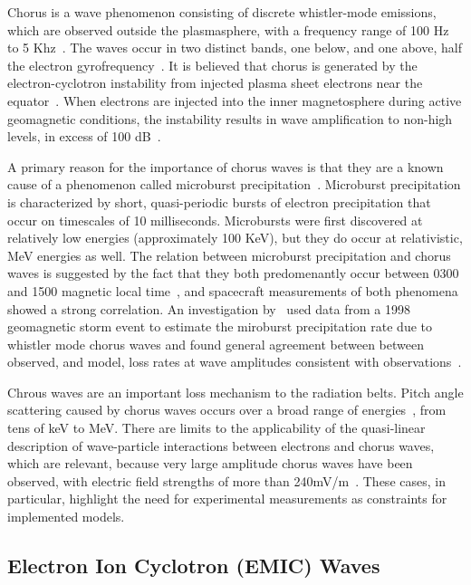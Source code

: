 Chorus is a wave phenomenon consisting of discrete whistler-mode emissions, which are observed outside the plasmasphere, with a frequency range of 100 Hz to 5 Khz~\citep{millan2007}. The waves occur in two distinct bands, one below, and one above, half the electron gyrofrequency~\citep{Tsurutani1974,thorne2010}. It is believed that chorus is generated by the electron-cyclotron instability from injected plasma sheet electrons near the equator~\citep{kennel1966,millan2007}. When electrons are injected into the inner magnetosphere during active geomagnetic conditions, the instability results in wave amplification to non-high levels, in excess of 100 dB~\citep{li2008,li2009,thorne2010}. 

A primary reason for the importance of chorus waves is that they are a known cause of a phenomenon called microburst precipitation~\citep{millan2007}. Microburst precipitation is characterized by short, quasi-periodic bursts of electron precipitation that occur on timescales of 10 milliseconds. Microbursts were first discovered at relatively low energies (approximately 100 KeV), but they do occur at relativistic, MeV energies as well. The relation between microburst precipitation and chorus waves is suggested by the fact that they both predomenantly occur between 0300 and 1500 magnetic local time~\citep{lorentzen2001,millan2007}, and spacecraft measurements of both phenomena showed a strong correlation. An investigation by~\citet{thorne2005} used data from a 1998 geomagnetic storm event to estimate the miroburst precipitation rate due to whistler mode chorus waves and found general agreement between between observed, and model, loss rates at wave amplitudes consistent with observations~\citet{millan2007}.

Chrous waves are an important loss mechanism to the radiation belts. Pitch angle scattering caused by chorus waves occurs over a broad range of energies~\citet{thorne2010}, from tens of keV to MeV. There are limits to the applicability of the quasi-linear description of wave-particle interactions between electrons and chorus waves, which are relevant, because very large amplitude chorus waves have been observed, with electric field strengths of more than 240mV/m~\citep{cattell2008,thorne2010}. These cases, in particular, highlight the need for experimental measurements as constraints for implemented models. 

\subsection{Electron Ion Cyclotron (EMIC) Waves}

